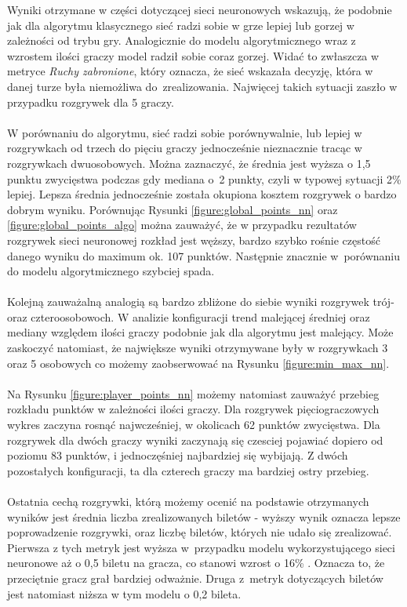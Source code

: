 \documentclass[12pt, oneside]{report}
\begin{document}
	Wyniki otrzymane w części dotyczącej sieci neuronowych wskazują, że podobnie jak dla algorytmu klasycznego sieć radzi sobie w grze lepiej lub gorzej w zależności od trybu gry. Analogicznie do modelu algorytmicznego wraz z wzrostem ilości graczy model radził sobie coraz gorzej. Widać to zwłaszcza w metryce \textit{Ruchy zabronione}, który oznacza, że sieć wskazała decyzję, która w danej turze była niemożliwa do~zrealizowania. Najwięcej takich sytuacji zaszło w przypadku rozgrywek dla 5 graczy. \\ \\
	W porównaniu do algorytmu, sieć radzi sobie porównywalnie, lub lepiej w rozgrywkach od trzech do pięciu graczy jednocześnie nieznacznie tracąc w rozgrywkach dwuosobowych. Można zaznaczyć, że średnia jest wyższa o 1,5 punktu zwycięstwa podczas gdy mediana o~2 punkty, czyli w typowej sytuacji 2\% lepiej. Lepsza średnia jednocześnie została okupiona kosztem rozgrywek o bardzo dobrym wyniku. Porównując Rysunki \ref{figure:global_points_nn} oraz \ref{figure:global_points_algo} można zauważyć, że w przypadku rezultatów rozgrywek sieci neuronowej rozkład jest węższy, bardzo szybko rośnie częstość danego wyniku do maximum ok. 107 punktów. Następnie znacznie w~porównaniu do modelu algorytmicznego szybciej spada. \\ \\
	Kolejną zauważalną analogią są bardzo zbliżone do siebie wyniki rozgrywek trój- oraz czteroosobowoch. W analizie konfiguracji trend malejącej średniej oraz mediany względem ilości graczy podobnie jak dla algorytmu jest malejący. Może zaskoczyć natomiast, że największe wyniki otrzymywane były w rozgrywkach 3 oraz 5 osobowych co możemy zaobserwować na Rysunku \ref{figure:min_max_nn}. \\ \\
	Na Rysunku \ref{figure:player_points_nn} możemy natomiast zauważyć przebieg rozkładu punktów w zależności ilości graczy. Dla rozgrywek pięciograczowych wykres zaczyna rosnąć najwcześniej, w okolicach 62 punktów zwycięstwa. Dla rozgrywek dla dwóch graczy wyniki zaczynają się czesciej pojawiać dopiero od poziomu 83 punktów, i jednoczęśniej najbardziej się wybijają. Z dwóch pozostałych konfiguracji, ta dla czterech graczy ma bardziej ostry przebieg. \\ \\
	Ostatnia cechą rozgrywki, którą możemy ocenić na podstawie otrzymanych wyników jest średnia liczba zrealizowanych biletów - wyższy wynik oznacza lepsze poprowadzenie rozgrywki, oraz liczbę biletów, których nie udało się zrealizować. Pierwsza z tych metryk jest wyższa w~przypadku modelu wykorzystującego sieci neuronowe aż o 0,5 biletu na gracza, co stanowi wzrost o 16\% . Oznacza to, że przeciętnie gracz grał bardziej odważnie. Druga z~metryk dotyczących biletów jest natomiast niższa w tym modelu o 0,2 bileta. 
\end{document}

